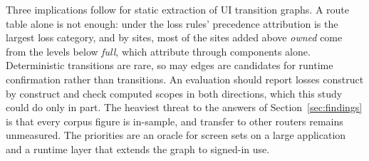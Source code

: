 Three implications follow for static extraction of UI transition graphs. A route table alone is not
enough: under the loss rules' precedence attribution is the largest loss category, and by sites, most of the sites added above \emph{owned} come from the
levels below \emph{full}, which attribute through components alone. Deterministic transitions are rare, so may edges are
candidates for runtime confirmation rather than transitions. An evaluation should report losses
construct by construct and check computed scopes in both directions, which this study could do only
in part. The heaviest threat to the answers of Section~\ref{sec:findings} is that every corpus figure is
in-sample, and transfer to other routers remains unmeasured. The priorities are an oracle for screen sets on a
large application and a runtime layer that extends the graph to signed-in use.
